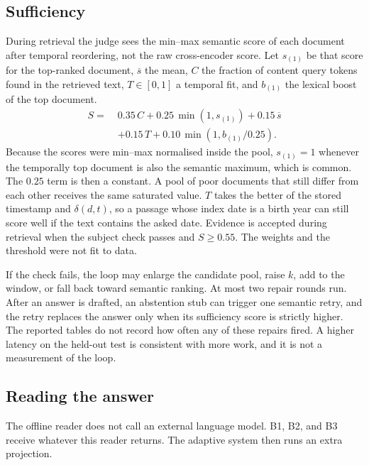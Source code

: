 \documentclass[11pt,letterpaper]{article}
\begin{document}
\subsection{Sufficiency}

During retrieval the judge sees the min--max semantic score of each document after temporal reordering, not the raw cross-encoder score.
Let $s_{(1)}$ be that score for the top-ranked document, $\overline{s}$ the mean, $C$ the fraction of content query tokens found in the retrieved text, $T\in[0,1]$ a temporal fit, and $b_{(1)}$ the lexical boost of the top document.
\begin{equation}
\begin{aligned}
S =\;& 0.35\,C + 0.25\,\min(1, s_{(1)}) + 0.15\,\overline{s}\\
&+ 0.15\,T + 0.10\,\min(1, b_{(1)}/0.25).
\end{aligned}
\label{eq:suff}
\end{equation}
Because the scores were min--max normalised inside the pool, $s_{(1)}=1$ whenever the temporally top document is also the semantic maximum, which is common.
The $0.25$ term is then a constant.
A pool of poor documents that still differ from each other receives the same saturated value.
$T$ takes the better of the stored timestamp and $\delta(d,t)$, so a passage whose index date is a birth year can still score well if the text contains the asked date.
Evidence is accepted during retrieval when the subject check passes and $S\ge 0.55$.
The weights and the threshold were not fit to data.

If the check fails, the loop may enlarge the candidate pool, raise $k$, add to the window, or fall back toward semantic ranking.
At most two repair rounds run.
After an answer is drafted, an abstention stub can trigger one semantic retry, and the retry replaces the answer only when its sufficiency score is strictly higher.
The reported tables do not record how often any of these repairs fired.
A higher latency on the held-out test is consistent with more work, and it is not a measurement of the loop.

\subsection{Reading the answer}
\label{sec:reader}

The offline reader does not call an external language model.
B1, B2, and B3 receive whatever this reader returns.
The adaptive system then runs an extra projection.
\end{document}
